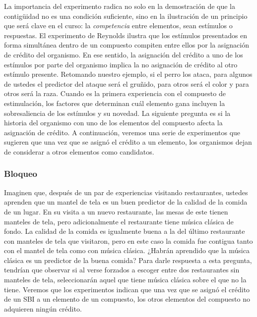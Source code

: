 \documentclass[
  a4paper,
  DIV=11,
  numbers=noendperiod]{scrreprt}
\begin{document}
La importancia del experimento radica no solo en la demostración de que
la contigüidad no es una condición suficiente, sino en la ilustración de
un principio que será clave en el curso: la \emph{competencia} entre
elementos, sean estímulos o respuestas. El experimento de Reynolds
ilustra que los estímulos presentados en forma simultánea dentro de un
compuesto compiten entre ellos por la asignación de crédito del
organismo. En ese sentido, la asignación del crédito a uno de los
estímulos por parte del organismo implica la no asignación de crédito al
otro estímulo presente. Retomando nuestro ejemplo, si el perro los
ataca, para algunos de ustedes el predictor del ataque será el gruñido,
para otros será el color y para otros será la raza. Cuando es la primera
experiencia con el compuesto de estimulación, los factores que
determinan cuál elemento gana incluyen la sobresaliencia de los
estímulos y su novedad. La siguiente pregunta es si la historia del
organismo con uno de los elementos del compuesto afecta la asignación de
crédito. A continuación, veremos una serie de experimentos que sugieren
que una vez que se asignó el crédito a un elemento, los organismos dejan
de considerar a otros elementos como candidatos.

\subsubsection{Bloqueo}\label{bloqueo}

Imaginen que, después de un par de experiencias visitando restaurantes,
ustedes aprenden que un mantel de tela es un buen predictor de la
calidad de la comida de un lugar. En su visita a un nuevo restaurante,
las mesas de este tienen manteles de tela, pero adicionalmente el
restaurante tiene música clásica de fondo. La calidad de la comida es
igualmente buena a la del último restaurante con manteles de tela que
visitaron, pero en este caso la comida fue contigua tanto con el mantel
de tela como con música clásica. ¿Habrán aprendido que la música clásica
es un predictor de la buena comida? Para darle respuesta a esta
pregunta, tendrían que observar si al verse forzados a escoger entre dos
restaurantes sin manteles de tela, seleccionarán aquel que tiene música
clásica sobre el que no la tiene. Veremos que los experimentos indican
que una vez que se asignó el crédito de un SBI a un elemento de un
compuesto, los otros elementos del compuesto no adquieren ningún
crédito.
\end{document}
